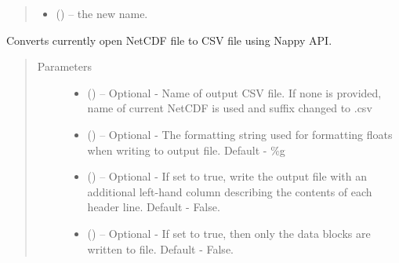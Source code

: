 \documentclass[a4paper,10pt,openany,english]{sphinxmanual}
\begin{document}
\begin{fulllineitems}
\begin{fulllineitems}
\begin{quote}
\begin{description}
\begin{itemize}
\item {} 
 () -- the new name.

\end{itemize}

\end{description}\end{quote}

\end{fulllineitems}


\begin{fulllineitems}
\label{egadsapi:egads.input.netcdf_io.NetCdf.convert_to_csv}
Converts currently open NetCDF file to CSV file using Nappy API.
\begin{quote}\begin{description}
\item[{Parameters}] \leavevmode\begin{itemize}
\item {} 
 () -- Optional - Name of output CSV file. If none is provided, name of current
NetCDF is used and suffix changed to .csv

\item {} 
 () -- Optional - The formatting string used for formatting floats when writing
to output file. Default - \%g

\item {} 
 () -- Optional - If set to true, write the output file with an additional left-hand
column describing the contents of each header line. Default - False.

\item {} 
 () -- Optional - If set to true, then only the data blocks are written to file.
Default - False.

\end{itemize}

\end{description}\end{quote}


\end{fulllineitems}
\end{fulllineitems}
\end{document}

